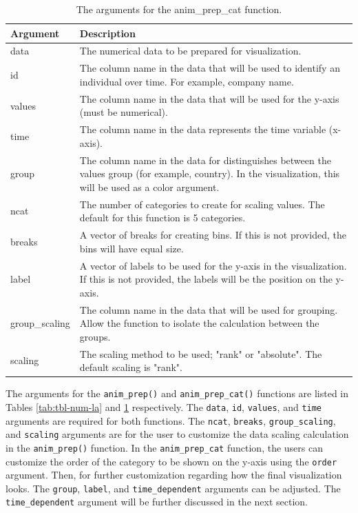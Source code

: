\begin{table}

\caption{\label{tab:tbl-cat-la}The arguments for the anim\_prep\_cat function.}
\centering
\begin{tabular}[t]{l|>{\raggedright\arraybackslash}p{30em}}
\hline
Argument & Description\\
\hline
data & The numerical data to be prepared for visualization.\\
\hline
id & The column name in the data that will be used to identify an individual over time. For example, company name.\\
\hline
values & The column name in the data that will be used for the y-axis (must be numerical).\\
\hline
time & The column name in the data represents the time variable (x-axis).\\
\hline
group & The column name in the data for distinguishes between the values group (for example, country). In the visualization, this will be used as a color argument.\\
\hline
ncat & The number of categories to create for scaling values. The default for this function is 5 categories.\\
\hline
breaks & A vector of breaks for creating bins. If this is not provided, the bins will have equal size.\\
\hline
label & A vector of labels to be used for the y-axis in the visualization. If this is not provided, the labels will be the position on the y-axis.\\
\hline
group\_scaling & The column name in the data that will be used for grouping. Allow the function to isolate the calculation between the groups.\\
\hline
scaling & The scaling method to be used; "rank" or "absolute". The default scaling is "rank".\\
\hline
\end{tabular}
\end{table}

The arguments for the \texttt{anim\_prep()} and \texttt{anim\_prep\_cat()} functions are listed in Tables \ref{tab:tbl-num-la} and \ref{tab:tbl-cat-la} respectively. The \texttt{data}, \texttt{id}, \texttt{values}, and \texttt{time} arguments are required for both functions. The \texttt{ncat}, \texttt{breaks}, \texttt{group\_scaling}, and \texttt{scaling} arguments are for the user to customize the data scaling calculation in the \texttt{anim\_prep()} function. In the \texttt{anim\_prep\_cat} function, the users can customize the order of the category to be shown on the y-axis using the \texttt{order} argument. Then, for further customization regarding how the final visualization looks. The \texttt{group}, \texttt{label}, and \texttt{time\_dependent} arguments can be adjusted. The \texttt{time\_dependent} argument will be further discussed in the next section.

